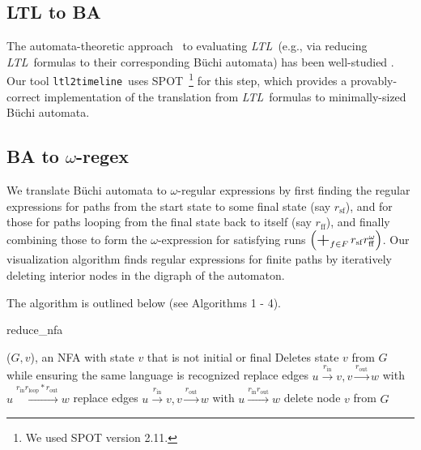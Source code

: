 \documentclass[conference]{IEEEtran}
\theoremstyle{definition}
\theoremstyle{remark}
\DeclareMathOperator*{\bigplus}{\scalerel*{+}{\sum}}
\newcommand{\ltl}{\textit{LTL}}
\newcommand{\Buchi}{B\"{u}chi }
\newcommand{\tool}{\texttt{ltl2timeline}}
\begin{document}
\subsection{LTL to BA} \label{ltl2aut}
The automata-theoretic approach~\cite{ORBi-a8d60ab6-1101-4434-9511-c01ea4e5a15b} to evaluating \ltl\ (e.g., via reducing \ltl\ formulas to their corresponding \Buchi automata) has been well-studied \cite{DGV99,F03,RV10,RV11,Dur14}. Our tool \tool\ uses SPOT~\cite{Dur22}\footnote{We used SPOT version 2.11.} for this step, which provides a provably-correct implementation of the translation from \ltl\ formulas to minimally-sized \Buchi automata.

\subsection{BA to $\omega$-regex} \label{aut2regex}
We translate \Buchi automata to $\omega$-regular expressions by first finding the regular expressions for paths from the start state to some final state (say $r_\mathrm{sf}$), and for those for paths looping from the final state back to itself (say $r_\mathrm{ff}$), and finally combining those to form the $\omega$-expression for satisfying runs $\left(\bigplus_{f\in F} r_\mathrm{sf}r_\mathrm{ff}^\omega\right)$. Our visualization algorithm finds regular expressions for finite paths by iteratively deleting interior nodes in the digraph of the automaton.

The algorithm is outlined below (see Algorithms 1 - 4). %

\begin{algorithm}[h!]
    \caption{reduce\_nfa}
    \begin{algorithmic}
        \Require ($G, v$), an NFA with state $v$ that is not initial or final
        \Ensure Deletes state $v$ from $G$ while ensuring the same language is recognized
                \State replace edges $u\xrightarrow{r_\mathrm{in}} v, v \xrightarrow{r_\mathrm{out}} w$ with $u \xrightarrow{r_\mathrm{in} r_\mathrm{loop}* r_\mathrm{out}} w$
            \Else
                \State replace edges $u\xrightarrow{r_\mathrm{in}} v, v \xrightarrow{r_\mathrm{out}} w$ with $u \xrightarrow{r_\mathrm{in}  r_\mathrm{out}} w$
            \EndIf
        \EndFor
	\State delete node $v$ from $G$
    \end{algorithmic}
\end{algorithm}
\end{document}
